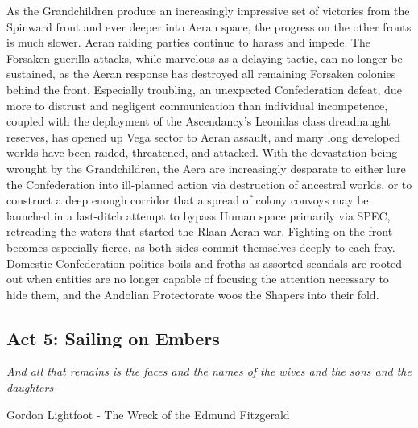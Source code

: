 As the Grandchildren produce an increasingly impressive set of
victories from the Spinward front and ever deeper into Aeran space,
the progress on the other fronts is much slower. Aeran raiding parties
continue to harass and impede. The Forsaken guerilla attacks, while
marvelous as a delaying tactic, can no longer be sustained, as the
Aeran response has destroyed all remaining Forsaken colonies behind
the front. Especially troubling, an unexpected Confederation defeat,
due more to distrust and negligent communication than individual
incompetence, coupled with the deployment of the Ascendancy's Leonidas
class dreadnaught reserves, has opened up Vega sector to Aeran
assault, and many long developed worlds have been raided, threatened,
and attacked. With the devastation being wrought by the Grandchildren,
the Aera are increasingly desparate to either lure the Confederation
into ill-planned action via destruction of ancestral worlds, or to
construct a deep enough corridor that a spread of colony convoys may
be launched in a last-ditch attempt to bypass Human space primarily
via SPEC, retreading the waters that started the Rlaan-Aeran
war. Fighting on the front becomes especially fierce, as both sides
commit themselves deeply to each fray. Domestic Confederation politics
boils and froths as assorted scandals are rooted out when entities are
no longer capable of focusing the attention necessary to hide them,
and the Andolian Protectorate woos the Shapers into their fold.

\subsection{Act 5: Sailing on Embers}

\begin{center}
{\it And all that remains is the faces and the names of the wives and the sons and the daughters}
	
Gordon Lightfoot - The Wreck of the Edmund Fitzgerald
\end{center}


